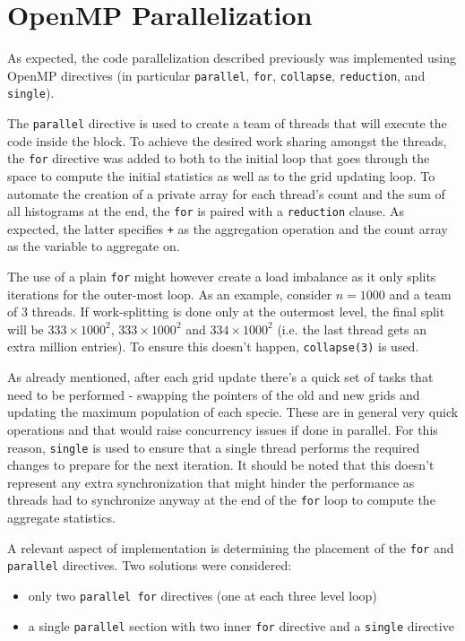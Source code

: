 \documentclass{article}
\begin{document}
\section{OpenMP Parallelization}

As expected, the code parallelization described previously was implemented
 using OpenMP directives (in particular \texttt{parallel}, \texttt{for}, \texttt{collapse}, 
\texttt{reduction}, and \texttt{single}).

The \texttt{parallel} directive is used to create a team of threads 
that will execute the code inside the block. To achieve the desired
work sharing amongst the threads, the \texttt{for} directive was added
to both to the initial loop that goes through the space to compute the initial
statistics as well as to the grid updating loop. To automate the creation
of a private array for each thread's count and the sum of all histograms at
the end, the \texttt{for} is paired with a \texttt{reduction} clause. As expected,
the latter specifies \texttt{+} as the aggregation operation and the count
array as the variable to aggregate on.

The use of a plain \texttt{for} might however create a load imbalance as it
only splits iterations for the outer-most loop. As an example, consider $n=1000$
and a team of 3 threads. If work-splitting is done only at the outermost level,
the final split will be $333 \times 1000^2$, $333 \times 1000^2$ and $334 \times 1000^2$
(i.e. the last thread gets an extra million entries). To ensure this doesn't happen,
\texttt{collapse(3)} is used.

As already mentioned, after each grid update there's a quick set of tasks that
need to be performed - swapping the pointers of the old and new grids and updating 
the maximum population of each specie. These are in general very quick operations
and that would raise concurrency issues if done in parallel. For this reason,
\texttt{single} is used to ensure that a single thread performs the required
changes to prepare for the next iteration. It should be noted that this doesn't
represent any extra synchronization that might hinder the performance as threads
had to synchronize anyway at the end of the \texttt{for} loop to compute the
aggregate statistics.

A relevant aspect of implementation is determining the placement of the \texttt{for} and 
\texttt{parallel} directives. Two solutions were considered:

\begin{itemize}
	\itemsep -0.2em
	\item only two \texttt{parallel for} directives (one at each three level
		loop)

	\item a single \texttt{parallel} section with two inner \texttt{for}
		directive and a \texttt{single} directive

\end{itemize}
\end{document}
